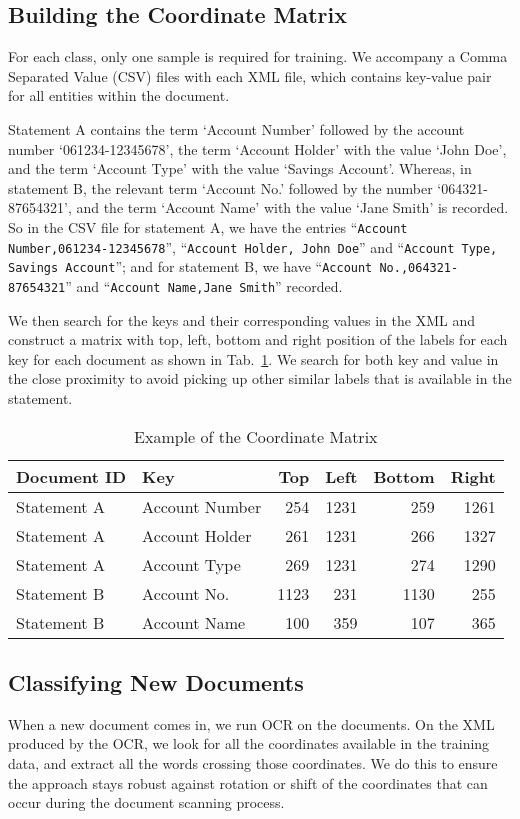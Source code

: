 \documentclass[runningheads]{llncs}
\begin{document}
\subsection{Building the Coordinate Matrix}
For each class, only one sample is required for training. We accompany a Comma Separated Value (CSV) files with each XML file, which contains key-value pair for all entities within the document.
\begin{example}
Statement A contains the term `Account Number’ followed by the account number `061234-12345678’, the term `Account Holder’ with the value `John Doe’, and the term `Account Type’ with the value `Savings Account’. Whereas, in statement B, the relevant term `Account No.’ followed by the number `064321-87654321’, and the term `Account Name’ with the value `Jane Smith’ is recorded. So in the CSV file for statement A, we have the entries ``\texttt{Account Number,061234-12345678}'', ``\texttt{Account Holder, John Doe}'' and ``\texttt{Account Type,\\Savings Account}''; and for statement B, we have ``\texttt{Account No.,064321-\\87654321}'' and ``\texttt{Account Name,Jane Smith}'' recorded.
\end{example}

We then search for the keys and their corresponding values in the XML and construct a matrix with top, left, bottom and right position of the labels for each key for each document as shown in Tab.~\ref{matrix}. We search for both key and value in the close proximity to avoid picking up other similar labels that is available in the statement.
\begin{table}
\centering
\caption{Example of the Coordinate Matrix}\label{matrix}
\begin{tabular}{|l|l|r|r|r|r|}
\hline
Document ID & Key & Top & Left & Bottom & Right\\
\hline
Statement A & Account Number & 254 & 1231 & 259 & 1261\\
Statement A & Account Holder & 261 & 1231 & 266 & 1327\\
Statement A & Account Type & 269 & 1231 & 274 & 1290\\
Statement B & Account No. & 1123 & 231 & 1130 & 255\\
Statement B & Account Name & 100 & 359 & 107 & 365\\
\hline
\end{tabular}
\end{table}

\subsection{Classifying New Documents}
When a new document comes in, we run OCR on the documents. On the XML produced by the OCR, we look for all the coordinates available in the training data, and extract all the words crossing those coordinates. We do this to ensure the approach stays robust against rotation or shift of the coordinates that can occur during the document scanning process.
\end{document}

